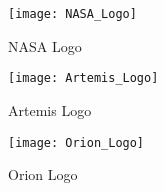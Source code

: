 \begin{minipage}[c]{0.33\textwidth}
   \begin{figure}[H]
      \centering
      \texttt{[image: NASA\_Logo]}
      \caption{NASA Logo} 
      \label{fig:nasa-logo}
   \end{figure}
\end{minipage}%
\begin{minipage}[c]{0.33\textwidth}
   \begin{figure}[H]
      \centering
      \texttt{[image: Artemis\_Logo]}
      \caption{Artemis Logo} 
      \label{fig:artemis-logo}
   \end{figure}
\end{minipage}
\begin{minipage}[c]{0.33\textwidth}
   \begin{figure}[H]
      \centering
      \texttt{[image: Orion\_Logo]}
      \caption{Orion Logo} 
      \label{fig:orion-logo}
   \end{figure}
\end{minipage}